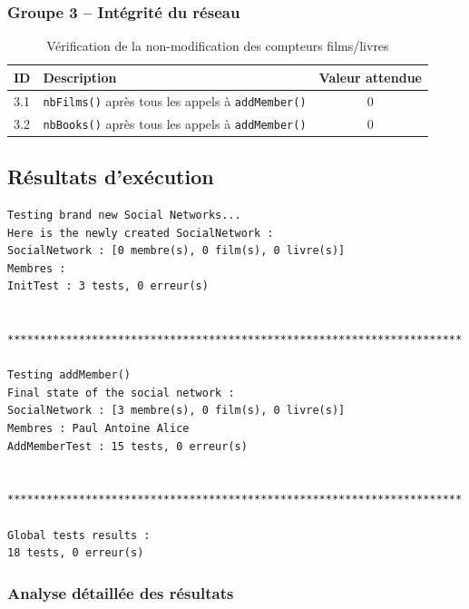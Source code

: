 \documentclass[12pt,a4paper]{article}
\begin{document}
\subsubsection{Groupe 3 -- Intégrité du réseau}

\begin{table}[H]
  \centering
  \caption{Vérification de la non-modification des compteurs films/livres}
  \begin{tabularx}{\linewidth}{l X c}
    \toprule
    \textbf{ID} & \textbf{Description} & \textbf{Valeur attendue} \\
    \midrule
    3.1 & \texttt{nbFilms()} après tous les appels à \texttt{addMember()} & 0 \\
    3.2 & \texttt{nbBooks()} après tous les appels à \texttt{addMember()} & 0 \\
    \bottomrule
  \end{tabularx}
\end{table}

\subsection{Résultats d'exécution}

\begin{successbox}

\begin{verbatim}
Testing brand new Social Networks...
Here is the newly created SocialNetwork :
SocialNetwork : [0 membre(s), 0 film(s), 0 livre(s)]
Membres :
InitTest : 3 tests, 0 erreur(s)


**********************************************************************

Testing addMember()
Final state of the social network :
SocialNetwork : [3 membre(s), 0 film(s), 0 livre(s)]
Membres : Paul Antoine Alice
AddMemberTest : 15 tests, 0 erreur(s)


**********************************************************************

Global tests results :
18 tests, 0 erreur(s)
\end{verbatim}
\end{successbox}

\subsubsection{Analyse détaillée des résultats}
\end{document}
